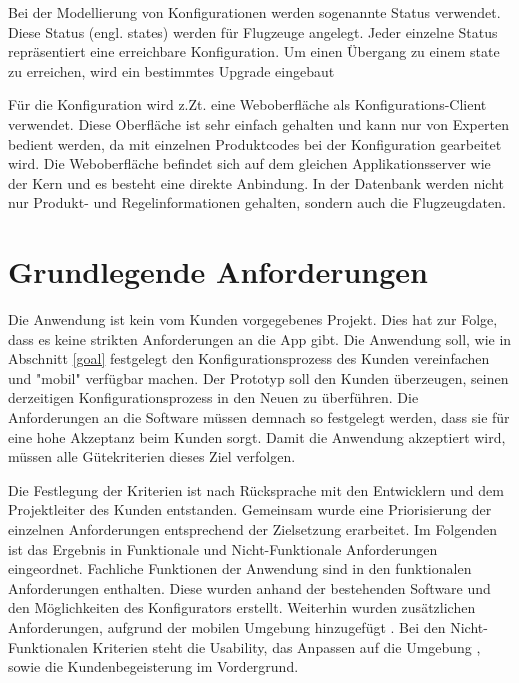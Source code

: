  Bei der Modellierung von Konfigurationen werden sogenannte Status verwendet. Diese Status (engl. states) werden für Flugzeuge angelegt. Jeder einzelne Status repräsentiert eine erreichbare Konfiguration. Um einen Übergang zu einem state zu erreichen, wird ein bestimmtes Upgrade eingebaut  
 \par

Für die Konfiguration wird z.Zt. eine Weboberfläche als Konfigurations-Client verwendet. Diese Oberfläche ist sehr einfach gehalten und kann nur von Experten bedient werden, da mit einzelnen Produktcodes bei der Konfiguration gearbeitet wird. Die Weboberfläche befindet sich auf dem gleichen Applikationsserver wie der Kern und es besteht eine direkte Anbindung. In der Datenbank werden nicht nur Produkt- und Regelinformationen gehalten, sondern auch die Flugzeugdaten. 

  
\section{Grundlegende Anforderungen}
Die Anwendung ist kein vom Kunden vorgegebenes Projekt. Dies hat zur Folge, dass es keine strikten Anforderungen an die App gibt. Die Anwendung soll, wie in Abschnitt \ref{goal} festgelegt den Konfigurationsprozess des Kunden vereinfachen und "mobil" verfügbar machen. Der Prototyp soll den Kunden überzeugen, seinen derzeitigen Konfigurationsprozess in den Neuen zu überführen. Die Anforderungen an die Software müssen demnach so festgelegt werden, dass sie für eine hohe Akzeptanz beim Kunden sorgt. Damit die Anwendung akzeptiert wird, müssen alle Gütekriterien dieses Ziel verfolgen. \par

Die Festlegung der Kriterien ist nach Rücksprache mit den Entwicklern und dem Projektleiter des Kunden entstanden. Gemeinsam wurde eine Priorisierung der einzelnen Anforderungen entsprechend der Zielsetzung erarbeitet. Im Folgenden ist das Ergebnis in Funktionale und Nicht-Funktionale Anforderungen eingeordnet. Fachliche Funktionen der Anwendung sind in den funktionalen Anforderungen enthalten. Diese wurden anhand der bestehenden Software und den Möglichkeiten des Konfigurators erstellt. Weiterhin wurden zusätzlichen Anforderungen, aufgrund der mobilen Umgebung hinzugefügt . Bei den Nicht-Funktionalen Kriterien steht die Usability, das Anpassen auf die Umgebung , sowie die Kundenbegeisterung im Vordergrund. 

